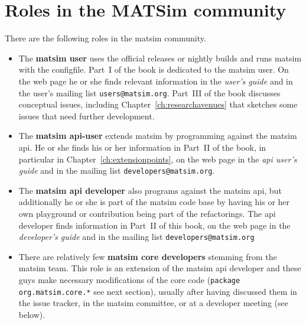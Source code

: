 \section{Roles in the MATSim community}
\label{sec:roles}
There are the following roles in the \gls{matsim} community.
%
\begin{itemize}\styleItemize
\item The \textbf{\gls{matsim} user} uses the official releases or nightly builds and runs \gls{matsim} with the \gls{configfile}. Part~I of the book is dedicated to the \gls{matsim} user. On the web page he or she finds relevant information in the \emph{user's guide} and in the user's mailing list \lstinline|users@matsim.org|.
%
Part~III of the book discusses conceptual issues, including Chapter~\ref{ch:researchavenues} that sketches some issues that need further development.
%
\item The \textbf{\gls{matsim} \gls{api}-user} extends \gls{matsim} by programming against the \gls{matsim} \gls{api}. He or she finds his or her information in Part~II of the book, in particular in Chapter~\ref{ch:extensionpoints}, on the web page in the \emph{\gls{api} user's guide} and in the mailing list \lstinline|developers@matsim.org|.
%
\item The \textbf{\gls{matsim} \gls{api} developer} also programs against the \gls{matsim} \gls{api}, but additionally he or she is part of the \gls{matsim} code base by having his or her own playground or \gls{contribution} being part of the refactorings. 
The \gls{api} developer finds information in Part~II of this book, on the web page in the \emph{developer's guide} and in the mailing list \lstinline|developers@matsim.org| 
%
\item There are relatively few \textbf{\gls{matsim} core developers} stemming from the \gls{matsim} team. This role is an extension of the \gls{matsim} \gls{api} developer and these guys make necessary modifications of the core code (\lstinline|package org.matsim.core.*| see next section), usually after having discussed them in the issue tracker, in the \gls{matsim} committee, or at a developer meeting (see below). 
%
\end{itemize}
%
